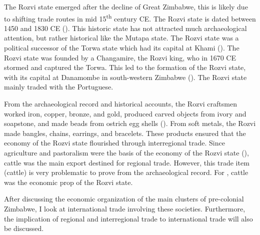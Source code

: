 
The Rozvi state emerged after the decline of Great Zimbabwe, this is likely due to shifting trade routes in mid 15\textsuperscript{th} century CE. The Rozvi state is dated between 1450 and 1830 CE (\cite[][]{pikirayi2006}). This historic state has not attracted much archaeological attention, but rather historical like the Mutapa state. The Rozvi state was a political successor of the Torwa state which had its capital at Khami (\cites[][]{pikirayi2006}[][]{pikirayi2013hist}[][]{manyanga2010}). The Rozvi state was founded by a Changamire, the Rozvi king, who in 1670 CE stormed and captured the Torwa. This led to the formation of the Rozvi state, with its capital at Danamombe in south-western Zimbabwe (\cites[][]{mudenge1988}[][]{beach1980}[][17]{huffman1996}). The Rozvi state mainly traded with the Portuguese.

From the archaeological record and historical accounts, the Rozvi craftsmen worked iron, copper, bronze, and gold, produced carved objects  from ivory and soapstone, and made beads from ostrich egg shells (\cite[][]{mudenge1974}). From soft metals, the Rozvi made bangles, chains, earrings, and bracelets. These products ensured that the economy of the Rozvi state flourished through interregional trade. Since agriculture and pastoralism were the basis of the economy of the Rozvi state (\cite[][]{mudenge1974}), cattle was the main export destined for regional trade. However, this trade item (cattle) is very problematic to prove from the archaeological record. For \textcite[][]{mudenge1974}, cattle was the economic prop of the Rozvi state.


After discussing the economic organization of the main clusters of pre-colonial Zimbabwe, I  look at international trade involving these societies. Furthermore, the implication of regional and interregional trade to international trade will also be discussed.

